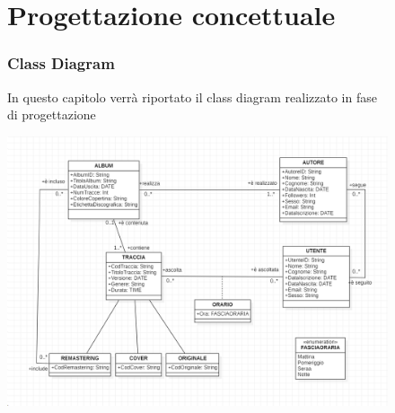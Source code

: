 \documentclass[11pt]{article}
\begin{document}
	\clearpage
	
	\begin{figure}
		\part{Progettazione concettuale}
		\section{Class Diagram}
		In questo capitolo verrà riportato il class diagram realizzato in fase di progettazione 
	
		\includegraphics[scale = 0.5]{SpotifyPezzotto}
	\end{figure}

	\clearpage
\end{document}
